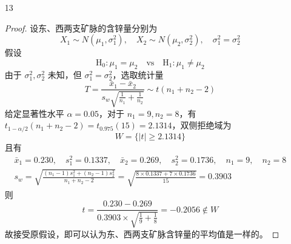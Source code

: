 \documentclass[normal,founder,mtpro2,cn]{elegantnote}
\begin{document}
\begin{enumerate}
\begin{proof}
\begin{gather*}
            \end{gather*}
            则
            \begin{equation*}
                t=\frac{5.5-4.3667}{0.4951\times\sqrt{\frac{1}{11}+\frac{1}{12}}}=5.4844\in W
            \end{equation*}
            故拒绝原假设，即可以认为型号 A 的计算器平均使用时间明显比型号 B 来得长。
        \end{proof}
    \item[13]
        \begin{proof}
            设东、西两支矿脉的含锌量分别为
            \begin{equation*}
                X_{1}\sim N\left(\mu_{1},\sigma_{1}^{2}\right),\quad X_{2}\sim N\left(\mu_{2},\sigma_{2}^{2}\right),\quad\sigma_{1}^{2}=\sigma_{2}^{2}
            \end{equation*}
            假设
            \begin{equation*}
                \mathrm{H}_{0}:\mu_{1}=\mu_{2}\quad\text{vs}\quad\mathrm{H}_{1}:\mu_{1}\neq\mu_{2}
            \end{equation*}
            由于 $\sigma_{1}^{2},\sigma_{2}^{2}$ 未知，但 $\sigma_{1}^{2}=\sigma_{2}^{2}$，选取统计量
            \begin{equation*}
                T=\frac{\bar{x}_{1}-\bar{x}_{2}}{s_{w}\sqrt{\frac{1}{n_{1}}+\frac{1}{n_{2}}}}\sim t\left(n_{1}+n_{2}-2\right)
            \end{equation*}
            给定显著性水平 $\alpha=0.05$，对于 $n_{1}=9,n_{2}=8$，有$t_{1-\alpha/2}\left(n_{1}+n_{2}-2\right)=t_{0.975}(15)=2.1314$，双侧拒绝域为
            \begin{equation*}
                W=\{|t|\geq 2.1314\}
            \end{equation*}
            且有
            \begin{gather*}
                \bar{x}_{1}=0.230,\quad s_{1}^{2}=0.1337,\quad\bar{x}_{2}=0.269,\quad s_{2}^{2}=0.1736,\quad n_{1}=9,\quad n_{2}=8\\
                s_{w}=\sqrt{\frac{\left(n_{1}-1\right)s_{1}^{2}+\left(n_{2}-1\right)s_{2}^{2}}{n_{1}+n_{2}-2}}=\sqrt{\frac{8 \times 0.1337+7 \times 0.1736}{15}}=0.3903
            \end{gather*}
            则
            \begin{equation*}
                t=\frac{0.230-0.269}{0.3903\times\sqrt{\frac{1}{9}+\frac{1}{8}}}=-0.2056\notin W
            \end{equation*}
            故接受原假设，即可以认为东、西两支矿脉含锌量的平均值是一样的。

\end{proof}
\end{enumerate}
\end{document}
